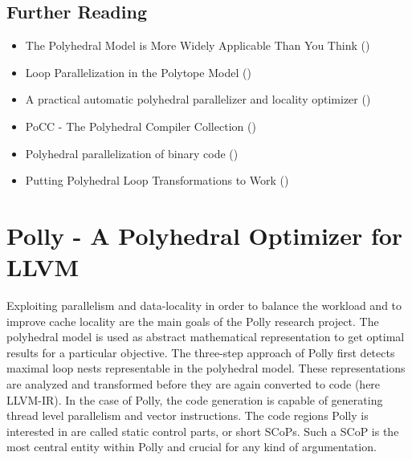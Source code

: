 \subsection*{Further Reading}
\begin{itemize}
  \item The Polyhedral Model is More Widely Applicable Than You Think (\citet{BPCB10})
  \item Loop Parallelization in the Polytope Model (\citet{Lengauer93loopparallelization})  
  \item  A practical automatic polyhedral parallelizer and locality optimizer (\citet{Bondhugula:2008:PAP:1379022.1375595})
  \item PoCC - The Polyhedral Compiler Collection (\citet{PoCC:Online})
  \item Polyhedral parallelization of binary code (\citet{Pradelle:2012:PPB:2086696.2086718})
  \item Putting Polyhedral Loop Transformations to Work (\citet{BCGST03})
\end{itemize}

\clearpage

\section{Polly - A Polyhedral Optimizer for LLVM}
\label{Polly}
Exploiting parallelism and data-locality in order to balance the workload
and to improve cache locality are the main goals of the Polly research project.
The polyhedral model is used as abstract mathematical representation to get optimal
results for a particular objective. The three-step approach of Polly first detects
maximal loop nests representable in the polyhedral model.
These representations
are analyzed and transformed before they are again converted to code (here LLVM-IR).
In the case of Polly, the code generation is capable of generating thread 
level parallelism and vector instructions. The code regions Polly is interested 
in are called static control parts, or short SCoPs. Such a SCoP is 
the most central entity within Polly and crucial for any kind of argumentation.



